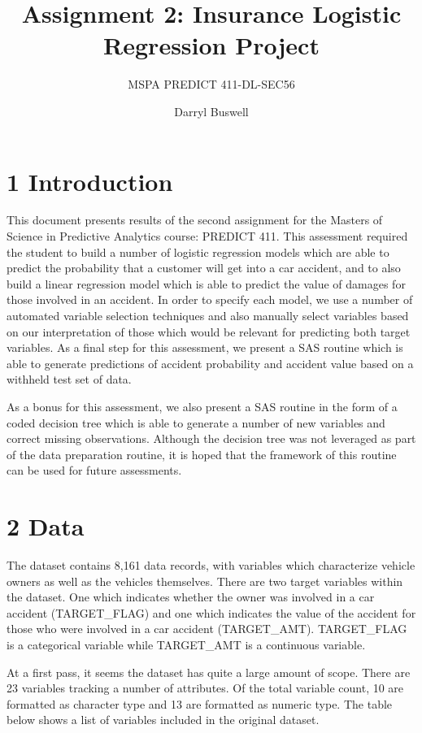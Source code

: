 \documentclass[]{article}
\title{Assignment 2: Insurance Logistic Regression Project}
\subtitle{MSPA PREDICT 411-DL-SEC56}
\author{Darryl Buswell}
\date{}
\begin{document}
\maketitle

\section{1 Introduction}\label{introduction}

This document presents results of the second assignment for the Masters
of Science in Predictive Analytics course: PREDICT 411. This assessment
required the student to build a number of logistic regression models
which are able to predict the probability that a customer will get into
a car accident, and to also build a linear regression model which is
able to predict the value of damages for those involved in an accident.
In order to specify each model, we use a number of automated variable
selection techniques and also manually select variables based on our
interpretation of those which would be relevant for predicting both
target variables. As a final step for this assessment, we present a SAS
routine which is able to generate predictions of accident probability
and accident value based on a withheld test set of data.

As a bonus for this assessment, we also present a SAS routine in the
form of a coded decision tree which is able to generate a number of new
variables and correct missing observations. Although the decision tree
was not leveraged as part of the data preparation routine, it is hoped
that the framework of this routine can be used for future assessments.

\section{2 Data}\label{data}

The dataset contains 8,161 data records, with variables which
characterize vehicle owners as well as the vehicles themselves. There
are two target variables within the dataset. One which indicates whether
the owner was involved in a car accident (TARGET\_FLAG) and one which
indicates the value of the accident for those who were involved in a car
accident (TARGET\_AMT). TARGET\_FLAG is a categorical variable while
TARGET\_AMT is a continuous variable.

At a first pass, it seems the dataset has quite a large amount of scope.
There are 23 variables tracking a number of attributes. Of the total
variable count, 10 are formatted as character type and 13 are formatted
as numeric type. The table below shows a list of variables included in
the original dataset.
\end{document}
